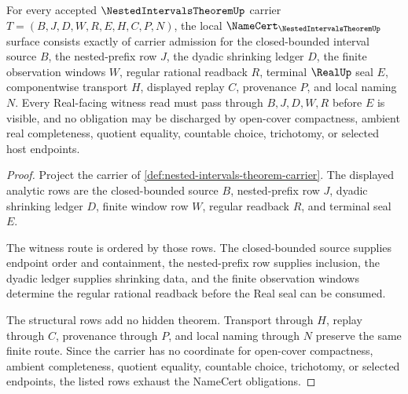 \begin{theorem}
\label{thm:nested-intervals-theorem-namecert-obligations}
For every accepted $\NestedIntervalsTheoremUp$ carrier $T=(B,J,D,W,R,E,H,C,P,N)$, the local $\NameCert_{\NestedIntervalsTheoremUp}$ surface consists exactly of carrier admission for the closed-bounded interval source $B$, the nested-prefix row $J$, the dyadic shrinking ledger $D$, the finite observation windows $W$, regular rational readback $R$, terminal $\RealUp$ seal $E$, componentwise transport $H$, displayed replay $C$, provenance $P$, and local naming $N$. Every Real-facing witness read must pass through $B,J,D,W,R$ before $E$ is visible, and no obligation may be discharged by open-cover compactness, ambient real completeness, quotient equality, countable choice, trichotomy, or selected host endpoints.
\end{theorem}
\begin{proof}
Project the carrier of \autoref{def:nested-intervals-theorem-carrier}. The displayed analytic rows are the closed-bounded source $B$, nested-prefix row $J$, dyadic shrinking ledger $D$, finite window row $W$, regular readback $R$, and terminal seal $E$.

The witness route is ordered by those rows. The closed-bounded source supplies endpoint order and containment, the nested-prefix row supplies inclusion, the dyadic ledger supplies shrinking data, and the finite observation windows determine the regular rational readback before the Real seal can be consumed.

The structural rows add no hidden theorem. Transport through $H$, replay through $C$, provenance through $P$, and local naming through $N$ preserve the same finite route. Since the carrier has no coordinate for open-cover compactness, ambient completeness, quotient equality, countable choice, trichotomy, or selected endpoints, the listed rows exhaust the NameCert obligations.
\end{proof}


